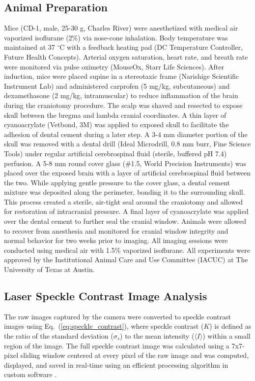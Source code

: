 \documentclass[12pt]{spieman}  %
\begin{document}
\begin{spacing}{2}
\subsection{Animal Preparation}
Mice (CD-1, male, 25-30 g, Charles River) were anesthetized with medical air vaporized isoflurane (2\%) via nose-cone inhalation. Body temperature was maintained at 37 $^\circ$C with a feedback heating pad (DC Temperature Controller, Future Health Concepts). Arterial oxygen saturation, heart rate, and breath rate were monitored via pulse oximetry (MouseOx, Starr Life Sciences). After induction, mice were placed supine in a stereotaxic frame (Narishige Scientific Instrument Lab) and administered carprofen (5 mg/kg, subcutaneous) and dexamethasone (2 mg/kg, intramuscular) to reduce inflammation of the brain during the craniotomy procedure. The scalp was shaved and resected to expose skull between the bregma and lambda cranial coordinates. A thin layer of cyanoacrylate (Vetbond, 3M) was applied to exposed skull to facilitate the adhesion of dental cement during a later step. A 3-4 mm diameter portion of the skull was removed with a dental drill (Ideal Microdrill, 0.8 mm burr, Fine Science Tools) under regular artificial cerebrospinal fluid (sterile, buffered pH 7.4) perfusion. A 5-8 mm round cover glass (\#1.5, World Precision Instruments) was placed over the exposed brain with a layer of artificial cerebrospinal fluid between the two. While applying gentle pressure to the cover glass, a dental cement mixture was deposited along the perimeter, bonding it to the surrounding skull. This process created a sterile, air-tight seal around the craniotomy and allowed for restoration of intracranial pressure. A final layer of cyanoacrylate was applied over the dental cement to further seal the cranial window. Animals were allowed to recover from anesthesia and monitored for cranial window integrity and normal behavior for two weeks prior to imaging. All imaging sessions were conducted using medical air with 1.5\% vaporized isoflurane. All experiments were approved by the Institutional Animal Care and Use Committee (IACUC) at The University of Texas at Austin.


\subsection{Laser Speckle Contrast Image Analysis}
The raw images captured by the camera were converted to speckle contrast images using Eq.~(\ref{eq:speckle_contrast}), where speckle contrast ($K$) is defined as the ratio of the standard deviation ($\sigma_{s}$) to the mean intensity ($\langle{I}\rangle$) within a small region of the image. The full speckle contrast image was calculated using a 7x7-pixel sliding window centered at every pixel of the raw image and was computed, displayed, and saved in real-time using an efficient processing algorithm in custom software \cite{Tom:2008tg}.


\end{spacing}
\end{document}

